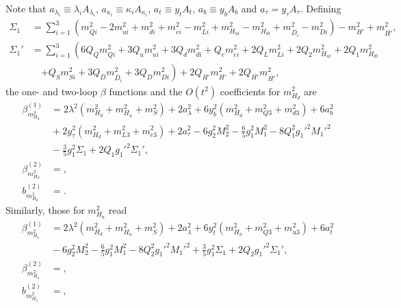 \documentclass[preprint,amsmath,amssymb,aps,superscriptaddress,prd,showpacs,floatfix,nofootinbib]{revtex4-1}
\begin{document}
Note that $a_{\lambda_i}\equiv\lambda_i A_{\lambda_i}$, $a_{\kappa_i}\equiv\kappa_i A_{\kappa_i}$, $a_t\equiv y_t A_t$, $a_b\equiv y_b A_b$ and $a_\tau= y_\tau A_\tau$. Defining 
\begin{align}
\Sigma_1&=\sum_{i=1}^3\left ( m_{Qi}^2-2m_{ui}^2+m_{di}^2+m_{ei}^2-m_{Li}^2+m_{H_{ui}}^2-m_{H_{di}}^2+m_{\overline{D}_i}^2-m_{Di}^2\right )-m_{H'}^2+m_{\overline{H'}}^2,\label{eq:USSMGaugeSigmaTerm1}\\
\Sigma_1'&=\sum_{i=1}^3\left ( 6Q_Qm_{Qi}^2+3Q_um_{ui}^2+3Q_dm_{di}^2+Q_em_{ei}^2+2Q_Lm_{Li}^2+2Q_2m_{H_{ui}}^2+2Q_1m_{H_{di}}^2\right.\nonumber\\
&\quad{}\left.+Q_Sm_{Si}^2+3Q_{\overline{D}}m_{\overline{D}_i}^2+3Q_Dm_{Di}^2\right )+2Q_{H'}m_{H'}^2+2Q_{\overline{H'}}m_{\overline{H'}}^2,\label{eq:USSMGaugeSigmaTerm1Pr}
\end{align}
the one- and two-loop $\beta$ functions and the $O(t^2)$ coefficients for $m_{H_d}^2$ are
\begin{subequations}
\begin{align}
\beta_{m_{H_d}^2}^{(1)}&=2\lambda^2\left ( m_{H_d}^2+m_{H_u}^2+m_S^2\right )+2a_\lambda^2+6y_b^2\left ( m_{H_d}^2+m_{Q3}^2+m_{d3}^2\right )+6a_b^2\nonumber\\
&{}+2y_\tau^2\left ( m_{H_d}^2+m_{L3}^2+m_{e3}^2\right )+2a_\tau^2-6g_2^2 M_2^2-\frac{6}{5}g_1^2 M_1^2-8Q_1^2g_1'^2 M_1'^2\nonumber\\
&{}-\frac{3}{5}g_1^2\Sigma_1+2Q_1g_1'^2\Sigma_1',\label{eq:USSMmHd2BetaOneLoop}\\
\beta_{m_{H_d}^2}^{(2)}&=,\label{eq:USSMmHd2BetaTwoLoop}\\
b_{m_{H_d}^2}^{(2)}&=.\label{eq:USSMmHd2Ot2Coeff}
\end{align}
\end{subequations}
Similarly, those for $m_{H_u}^2$ read
\begin{subequations}
\begin{align}
\beta_{m_{H_u}^2}^{(1)}&=2\lambda^2\left ( m_{H_d}^2+m_{H_u}^2+m_S^2\right )+2a_\lambda^2+6y_t^2\left ( m_{H_u}^2+m_{Q3}^2+m_{u3}^2\right )+6a_t^2\nonumber\\
&{}-6g_2^2M_2^2-\frac{6}{5}g_1^2M_1^2-8Q_2^2g_1'^2M_1'^2+\frac{3}{5}g_1^2\Sigma_1+2Q_2g_1'^2\Sigma_1',\label{eq:USSMmHu2BetaOneLoop}\\
\beta_{m_{H_u}^2}^{(2)}&=,\label{eq:USSMmHu2BetaTwoLoop}\\
b_{m_{H_u}^2}^{(2)}&=,\label{eq:USSMmHu2Ot2Coeff}
\end{align}
\end{subequations}
\end{document}
